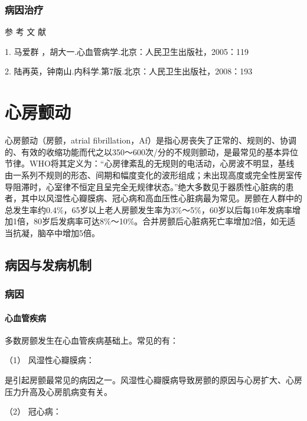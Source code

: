 \subsubsection{病因治疗}

\hypertarget{text00290.htmlux5cux23CHP10-2-3-4}{}
参 考 文 献

1. 马爱群 ，胡大一.心血管病学.北京：人民卫生出版社，2005：119

2. 陆再英，钟南山.内科学.第7版.北京：人民卫生出版社，2008：193

\protect\hypertarget{text00291.html}{}{}

\section{心房颤动}

心房颤动（房颤，atrial
fibrillation，Af）是指心房丧失了正常的、规则的、协调的、有效的收缩功能而代之以350～600次/分的不规则颤动，是最常见的基本异位节律。WHO将其定义为：“心房律紊乱的无规则的电活动，心房波不明显，基线由一系列不规则的形态、间期和幅度变化的波形组成；未出现高度或完全性房室传导阻滞时，心室律不恒定且呈完全无规律状态。”绝大多数见于器质性心脏病的患者，其中以风湿性心瓣膜病、冠心病和高血压性心脏病最为常见。房颤在人群中的总发生率约0.4\%，65岁以上老人房颤发生率为3\%～5\%，60岁以后每10年发病率增加1倍，80岁后发病率可达8\%～10\%。合并房颤后心脏病死亡率增加2倍，如无适当抗凝，脑卒中增加5倍。

\subsection{病因与发病机制}

\subsubsection{病因}

\paragraph{心血管疾病}

多数房颤发生在心血管疾病基础上。常见的有：

\hypertarget{text00291.htmlux5cux23CHP10-2-4-1-1-1-1}{}
（1） 风湿性心瓣膜病：

是引起房颤最常见的病因之一。风湿性心瓣膜病导致房颤的原因与心房扩大、心房压力升高及心房肌病变有关。

\hypertarget{text00291.htmlux5cux23CHP10-2-4-1-1-1-2}{}
（2） 冠心病：

